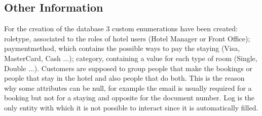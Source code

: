 \subsection{Other Information}
For the creation of the database 3 custom enumerations have been created: 
roletype, associated to the roles of hotel users (Hotel Manager or Front Office); 
paymentmethod, which contains the possible ways to pay the staying (Visa, MasterCard, Cash ...); 
category, containing a value for each type of room (Single, Double ...).
Customers are supposed to group people that make the bookings or people that stay in the hotel and also people that do both. 
This is the reason why some attributes can be null, for example the email is usually required for a booking but not for a staying and opposite for the document number.
Log is the only entity with which it is not possible to interact since it is automatically filled.
